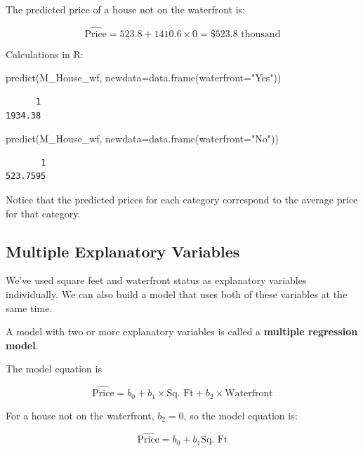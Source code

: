 \documentclass[
  letterpaper,
  DIV=11,
  numbers=noendperiod]{scrreprt}
\newenvironment{Shaded}{\begin{snugshade}}{\end{snugshade}}
\newcommand{\AttributeTok}[1]{\textcolor[rgb]{0.40,0.45,0.13}{#1}}
\newcommand{\FunctionTok}[1]{\textcolor[rgb]{0.28,0.35,0.67}{#1}}
\newcommand{\NormalTok}[1]{\textcolor[rgb]{0.00,0.23,0.31}{#1}}
\newcommand{\StringTok}[1]{\textcolor[rgb]{0.13,0.47,0.30}{#1}}
\begin{document}
The predicted price of a house not on the waterfront is:

\[
\widehat{\text{Price}} = 523.8 + 1410.6\times 0 = \$523.8{ \text{ thousand}}
\]

Calculations in R:

\begin{Shaded}
\begin{Highlighting}[]
\FunctionTok{predict}\NormalTok{(M\_House\_wf, }\AttributeTok{newdata=}\FunctionTok{data.frame}\NormalTok{(}\AttributeTok{waterfront=}\StringTok{"Yes"}\NormalTok{))}
\end{Highlighting}
\end{Shaded}

\begin{verbatim}
      1 
1934.38 
\end{verbatim}

\begin{Shaded}
\begin{Highlighting}[]
\FunctionTok{predict}\NormalTok{(M\_House\_wf, }\AttributeTok{newdata=}\FunctionTok{data.frame}\NormalTok{(}\AttributeTok{waterfront=}\StringTok{"No"}\NormalTok{))}
\end{Highlighting}
\end{Shaded}

\begin{verbatim}
       1 
523.7595 
\end{verbatim}

Notice that the predicted prices for each category correspond to the
average price for that category.

\subsection{Multiple Explanatory
Variables}\label{multiple-explanatory-variables}

We've used square feet and waterfront status as explanatory variables
individually. We can also build a model that uses both of these
variables at the same time.

A model with two or more explanatory variables is called a
\textbf{multiple regression model}.

The model equation is

\[
\widehat{\text{Price}} = b_0 + b_1\times\text{Sq. Ft} + b_2\times\text{Waterfront}
\]

For a house not on the waterfront, \(b_2=0\), so the model equation is:

\[
\widehat{\text{Price}} = b_0  + b_1\text{Sq. Ft} 
\]
\end{document}
